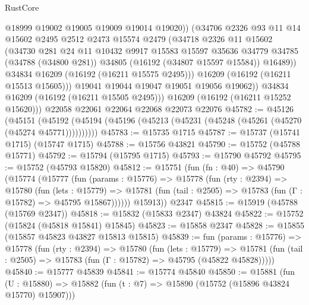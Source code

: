 \begin{lexlean}{RustCore}
\begin{coremodule}
                  @18999
                  @19002
                  @19005
                  @19009
                  @19014
                  @19020))
              (@34706
                @2326
                @93
                @11
                @14
                @15602
                @2495
                @2512
                @2473
                @15574
                @2479
                (@34718
                  @2326
                  @11
                  @15602
                  (@34730
                    @281
                    @24
                    @11
                    @10432
                    @9917
                    @15583
                    @15597
                    @35636
                    @34779
                    @34785
                    (@34788 (@34800 @281))
                    @34805
                    (@16192 (@34807 @15597 @15584))
                    @16489))
                @34834
                @16209
                (@16192 (@16211 @15575 @2495)))
              @16209
              (@16192 (@16211 @15513 @15605)))
            @19041
            @19044
            @19047
            @19051
            @19056
            @19062))
        @34834
        @16209
        (@16192 (@16211 @15505 @2495)))
      @16209
      (@16192 (@16211 @15252 @15620)))
    @22058
    @22061
    @22064
    @22068
    @22073
    @22076
@45782 := @45126
    (@45151 (@45192 (@45194 (@45196 (@45213 (@45231 (@45248 (@45261 (@45270 (@45274 @45771))))))))))
@45783 := @15735 @1715
@45787 := @15737 (@15741 @1715) (@15747 @1715)
@45788 := @15756 @43821
@45790 := @15752 (@45788 @15771)
@45792 := @15794 (@15795 @1715)
@45793 := @15790 @45792
@45795 := @15752 (@45793 @15820)
@45812 := @15751
    (fun (fn : @40) =>
    @45790
      (@15774
        (@15777
          (fun (params : @15776) =>
          @15778
            (fun (rty : @2394) =>
            @15780
              (fun (lets : @15779) =>
              @15781 (fun (tail : @2505) => @15783 (fun (Γ : @15782) => @45795 @15867))))))
        @15913))
    @2347
@45815 := @15919 (@45788 (@15769 @2347))
@45818 := @15832 (@15833 @2347) @43824
@45822 := @15752 (@15824 (@45818 @15841) @15845)
@45823 := @15858 @2347
@45828 := @15855 (@15857 @45823 @43827 @15813 @15815)
@45839 := fun (params : @15776) =>
  @15778
    (fun (rty : @2394) =>
    @15780
      (fun (lets : @15779) =>
      @15781 (fun (tail : @2505) => @15783 (fun (Γ : @15782) => @45795 (@45822 @45828)))))
@45840 := @15777 @45839
@45841 := @15774 @45840
@45850 := @15881
    (fun (U : @15880) => @15882 (fun (t : @7) => @15890 (@15752 (@15896 @43824 @15770) @15907)))

\end{coremodule}
\end{lexlean}
